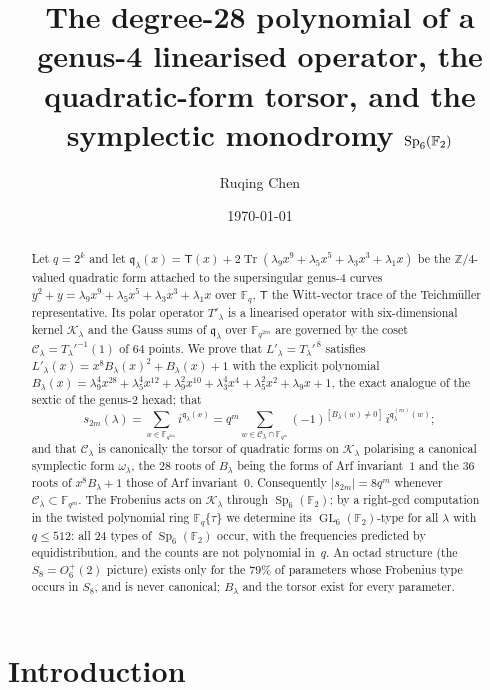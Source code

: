 \documentclass[12pt,a4paper]{amsart}
\title[The degree-28 polynomial and the quadratic-form torsor]{The degree-28 polynomial of a genus-4 linearised operator, the quadratic-form torsor, and the symplectic monodromy \texorpdfstring{$\Sp_6(\F_2)$}{Sp6(F2)}}
\author{Ruqing Chen}
\date{\today}
\theoremstyle{definition}
\newcommand{\F}{\mathbb{F}}
\newcommand{\Z}{\mathbb{Z}}
\newcommand{\Tr}{\operatorname{Tr}}
\newcommand{\Sp}{\operatorname{Sp}}
\newcommand{\GL}{\operatorname{GL}}
\newcommand{\Kk}{\mathcal{K}}
\newcommand{\Cc}{\mathcal{C}}
\newcommand{\qq}{\mathfrak{q}}
\newcommand{\Tw}{\mathsf{T}}
\newcommand{\Fq}{\F_{q}}
\begin{document}
\begin{abstract}
Let $q=2^k$ and let $\qq_\lambda(x)=\Tw(x)+2\Tr(\lambda_9x^9+\lambda_5x^5+\lambda_3x^3+\lambda_1x)$ be the $\Z/4$-valued quadratic form attached to the supersingular genus-$4$ curves $y^2+y=\lambda_9x^9+\lambda_5x^5+\lambda_3x^3+\lambda_1x$ over $\Fq$, $\Tw$ the Witt-vector trace of the Teichm\"uller representative. Its polar operator $T'_\lambda$ is a linearised operator with six-dimensional kernel $\Kk_\lambda$ and the Gauss sums of $\qq_\lambda$ over $\F_{q^{2m}}$ are governed by the coset $\Cc_\lambda=T_\lambda'^{-1}(1)$ of $64$ points. We prove that $L'_\lambda=T_\lambda'^{\,8}$ satisfies $L'_\lambda(x)=x^8B_\lambda(x)^2+B_\lambda(x)+1$ with the explicit polynomial $B_\lambda(x)=\lambda_9^4x^{28}+\lambda_5^4x^{12}+\lambda_9^2x^{10}+\lambda_3^4x^4+\lambda_5^2x^2+\lambda_9x+1$, the exact analogue of the sextic of the genus-$2$ hexad; that
\[
s_{2m}(\lambda)=\sum_{x\in\F_{q^{2m}}}i^{\qq_\lambda(x)}=q^m\sum_{w\in\Cc_\lambda\cap\F_{q^m}}(-1)^{[B_\lambda(w)\ne0]}\,i^{\qq^{(m)}_\lambda(w)};
\]
and that $\Cc_\lambda$ is canonically the torsor of quadratic forms on $\Kk_\lambda$ polarising a canonical symplectic form $\omega_\lambda$, the $28$ roots of $B_\lambda$ being the forms of Arf invariant~$1$ and the $36$ roots of $x^8B_\lambda+1$ those of Arf invariant~$0$. Consequently $|s_{2m}|=8q^m$ whenever $\Cc_\lambda\subset\F_{q^m}$. The Frobenius acts on $\Kk_\lambda$ through $\Sp_6(\F_2)$; by a right-gcd computation in the twisted polynomial ring $\Fq\{\tau\}$ we determine its $\GL_6(\F_2)$-type for all $\lambda$ with $q\le512$: all $24$ types of $\Sp_6(\F_2)$ occur, with the frequencies predicted by equidistribution, and the counts are not polynomial in~$q$. An octad structure (the $S_8=O_6^+(2)$ picture) exists only for the $79\%$ of parameters whose Frobenius type occurs in $S_8$, and is never canonical; $B_\lambda$ and the torsor exist for every parameter.
\end{abstract}

\maketitle

\section{Introduction}
\end{document}

